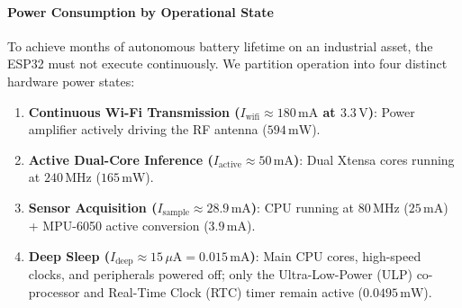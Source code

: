\paragraph{Power Consumption by Operational State}
To achieve months of autonomous battery lifetime on an industrial asset, the ESP32 must not execute continuously. We partition operation into four distinct hardware power states:
\begin{enumerate}
    \item \textbf{Continuous Wi-Fi Transmission ($I_{\text{wifi}} \approx 180\,\text{mA}$ at $3.3\,\text{V}$)}: Power amplifier actively driving the RF antenna ($594\,\text{mW}$).
    \item \textbf{Active Dual-Core Inference ($I_{\text{active}} \approx 50\,\text{mA}$)}: Dual Xtensa cores running at $240\,\text{MHz}$ ($165\,\text{mW}$).
    \item \textbf{Sensor Acquisition ($I_{\text{sample}} \approx 28.9\,\text{mA}$)}: CPU running at $80\,\text{MHz}$ ($25\,\text{mA}$) + MPU-6050 active conversion ($3.9\,\text{mA}$).
    \item \textbf{Deep Sleep ($I_{\text{deep}} \approx 15\,\mu\text{A} = 0.015\,\text{mA}$)}: Main CPU cores, high-speed clocks, and peripherals powered off; only the Ultra-Low-Power (ULP) co-processor and Real-Time Clock (RTC) timer remain active ($0.0495\,\text{mW}$).
\end{enumerate}

